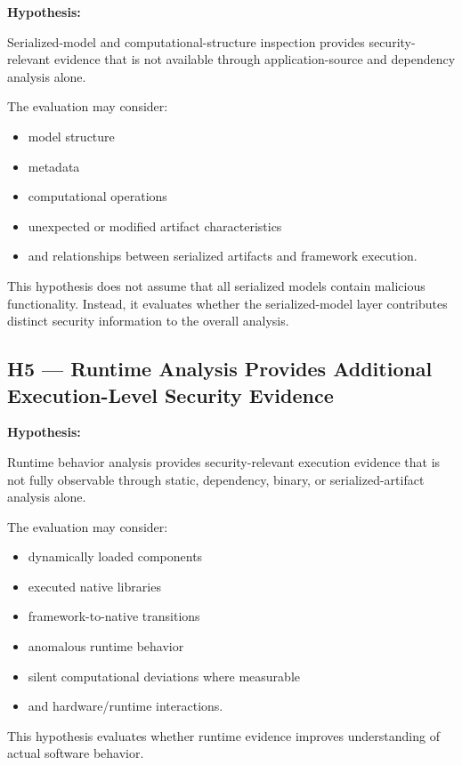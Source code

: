 \documentclass[
  12pt,
  letterpaper,
  oneside]{report}
\providecommand{\tightlist}{%
  \setlength{\itemsep}{0pt}\setlength{\parskip}{0pt}}
\begin{document}
\textbf{Hypothesis:}

Serialized-model and computational-structure inspection provides
security-relevant evidence that is not available through
application-source and dependency analysis alone.

The evaluation may consider:

\begin{itemize}
\tightlist
\item
  model structure
\item
  metadata
\item
  computational operations
\item
  unexpected or modified artifact characteristics
\item
  and relationships between serialized artifacts and framework
  execution.
\end{itemize}

This hypothesis does not assume that all serialized models contain
malicious functionality. Instead, it evaluates whether the
serialized-model layer contributes distinct security information to the
overall analysis.

\subsection{H5 --- Runtime Analysis Provides Additional Execution-Level
Security
Evidence}\label{h5--runtime-analysis-provides-additional-execution-level-security-evidence}

\textbf{Hypothesis:}

Runtime behavior analysis provides security-relevant execution evidence
that is not fully observable through static, dependency, binary, or
serialized-artifact analysis alone.

The evaluation may consider:

\begin{itemize}
\tightlist
\item
  dynamically loaded components
\item
  executed native libraries
\item
  framework-to-native transitions
\item
  anomalous runtime behavior
\item
  silent computational deviations where measurable
\item
  and hardware/runtime interactions.
\end{itemize}

This hypothesis evaluates whether runtime evidence improves
understanding of actual software behavior.
\end{document}
